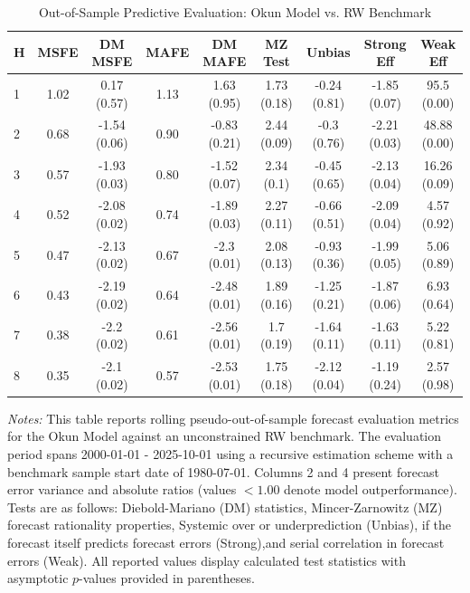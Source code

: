 \begin{table}[htbp]
\centering
\caption{Out-of-Sample Predictive Evaluation: Okun Model vs. RW Benchmark}
\label{tab:okun_model_evaluation}
\footnotesize
\begin{tabular}{l cccccccc}
\hline\hline
\rule{0pt}{3ex}
\textbf{H} & \textbf{MSFE} & \textbf{DM MSFE} & \textbf{MAFE} & \textbf{DM MAFE} & \textbf{MZ Test} & \textbf{Unbias} & \textbf{Strong Eff} & \textbf{Weak Eff} \\[0.5ex]
\hline
\rule{0pt}{2.5ex}
1 & 1.02 & 0.17 (0.57) & 1.13 & 1.63 (0.95) & 1.73 (0.18) & -0.24 (0.81) & -1.85 (0.07) & 95.5 (0.00) \\
2 & 0.68 & -1.54 (0.06) & 0.90 & -0.83 (0.21) & 2.44 (0.09) & -0.3 (0.76) & -2.21 (0.03) & 48.88 (0.00) \\
3 & 0.57 & -1.93 (0.03) & 0.80 & -1.52 (0.07) & 2.34 (0.1) & -0.45 (0.65) & -2.13 (0.04) & 16.26 (0.09) \\
4 & 0.52 & -2.08 (0.02) & 0.74 & -1.89 (0.03) & 2.27 (0.11) & -0.66 (0.51) & -2.09 (0.04) & 4.57 (0.92) \\
5 & 0.47 & -2.13 (0.02) & 0.67 & -2.3 (0.01) & 2.08 (0.13) & -0.93 (0.36) & -1.99 (0.05) & 5.06 (0.89) \\
6 & 0.43 & -2.19 (0.02) & 0.64 & -2.48 (0.01) & 1.89 (0.16) & -1.25 (0.21) & -1.87 (0.06) & 6.93 (0.64) \\
7 & 0.38 & -2.2 (0.02) & 0.61 & -2.56 (0.01) & 1.7 (0.19) & -1.64 (0.11) & -1.63 (0.11) & 5.22 (0.81) \\
8 & 0.35 & -2.1 (0.02) & 0.57 & -2.53 (0.01) & 1.75 (0.18) & -2.12 (0.04) & -1.19 (0.24) & 2.57 (0.98) \\
\hline\hline
\end{tabular}%
\par\smallskip
\parbox{\textwidth}{\scriptsize \textit{Notes:} This table reports rolling pseudo-out-of-sample forecast evaluation metrics for the Okun Model against an unconstrained RW benchmark. The evaluation period spans 2000-01-01 - 2025-10-01 using a recursive estimation scheme with a benchmark sample start date of 1980-07-01. Columns 2 and 4 present forecast error variance and absolute ratios (values $< 1.00$ denote model outperformance). Tests are as follows: Diebold-Mariano (DM) statistics, Mincer-Zarnowitz (MZ) forecast rationality properties, Systemic over or underprediction (Unbias), if the forecast itself predicts forecast errors (Strong),and serial correlation in forecast errors (Weak). All reported values display calculated test statistics with asymptotic $p$-values provided in parentheses.}
\end{table}
